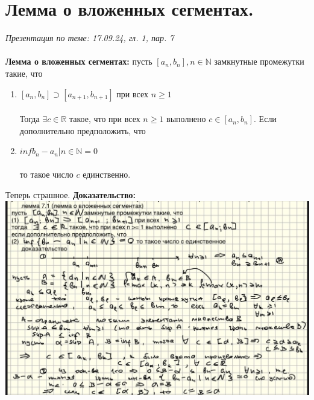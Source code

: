 \documentclass[10pt, a4paper,twocolumn]{article}
\begin{document}
\section{Лемма о вложенных сегментах.}
\textsl{Презентация по теме: 17.09.24, гл. 1, пар. 7}
\\ \\ \textbf{Лемма о вложенных сегментах:} пусть $[a_{n}, b_{n}], n \in \mathbb{N}$ замкнутные промежутки такие, что
\begin{enumerate}
    \item $[a_{n}, b_{n}] \supset [a_{n+1}, b_{n+1}]$ при всех $n \geq 1$
\\ \\Тогда $\exists c \in \mathbb{R}$ такое, что при всех $n \geq 1$ выполнено $c \in [a_{n}, b_{n}]$. Если дополнительно предположить, что 
    \item $inf {b_{n} - a_{n}|n \in \mathbb{N}} = 0$
\\ \\то такое число $c$ единственно.
\end{enumerate}
Теперь страшное. \textbf{Доказательство:}
\\ \includegraphics[width=1\linewidth]{lemmasegm}
\end{document}

